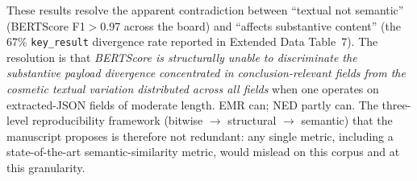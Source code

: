 \documentclass[11pt]{article}
\begin{document}
These results resolve the apparent contradiction between ``textual not semantic'' (BERTScore F1${>}$0.97 across the board) and ``affects substantive content'' (the 67\% \texttt{key\_result} divergence rate reported in Extended Data Table~7). The resolution is that \emph{BERTScore is structurally unable to discriminate the substantive payload divergence concentrated in conclusion-relevant fields from the cosmetic textual variation distributed across all fields} when one operates on extracted-JSON fields of moderate length. EMR can; NED partly can. The three-level reproducibility framework (bitwise $\rightarrow$ structural $\rightarrow$ semantic) that the manuscript proposes is therefore not redundant: any single metric, including a state-of-the-art semantic-similarity metric, would mislead on this corpus and at this granularity.
\end{document}
